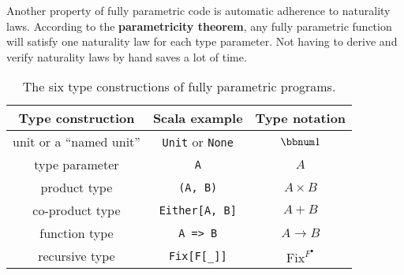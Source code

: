 Another property of fully parametric code is automatic adherence to
naturality laws. According to the \textbf{parametricity theorem},
any fully parametric function will satisfy one naturality law for
each type parameter. Not having to derive and verify naturality laws
by hand saves a lot of time.

\begin{wraptable}{l}{0.56\columnwidth}%
\begin{centering}
\vspace{-0.2\baselineskip}
\begin{tabular}{|c|c|c|}
\hline 
\textbf{\small{}Type construction} & \textbf{\small{}Scala example} & \textbf{\small{}Type notation}\tabularnewline
\hline 
\hline 
{\small{}unit or a \textsf{``}named unit\textsf{''}} & {\small{}}\lstinline!Unit!{\small{} or }\lstinline!None!{\small{} } & {\small{}$\bbnum 1$}\tabularnewline
\hline 
{\small{}type parameter} & {\small{}}\lstinline!A! & {\small{}$A$}\tabularnewline
\hline 
{\small{}product type} & {\small{}}\lstinline!(A, B)! & {\small{}$A\times B$}\tabularnewline
\hline 
{\small{}co-product type} & {\small{}}\lstinline!Either[A, B]! & {\small{}$A+B$}\tabularnewline
\hline 
{\small{}function type} & {\small{}}\lstinline!A => B! & {\small{}$A\rightarrow B$}\tabularnewline
\hline 
{\small{}recursive type} & {\small{}}\lstinline!Fix[F[_]]! & {\small{}$\text{Fix}^{F^{\bullet}}$}\tabularnewline
\hline 
\end{tabular}
\par\end{centering}
\caption{The six type constructions
of fully parametric programs.\label{tab:six-pure-type-constructions}}
\vspace{-0.2\baselineskip}
\end{wraptable}%

